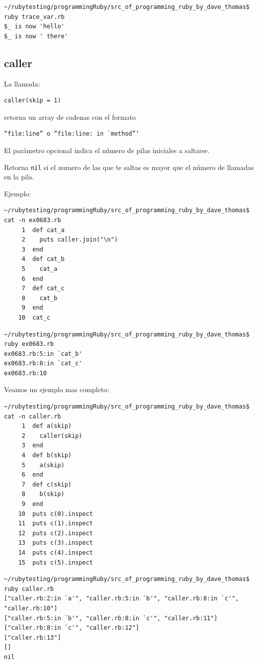 \begin{verbatim}
~/rubytesting/programmingRuby/src_of_programming_ruby_by_dave_thomas$ ruby trace_var.rb 
$_ is now 'hello'
$_ is now ' there'

\end{verbatim}

\subsection{caller}
La llamada:

\begin{verbatim}
caller(skip = 1) 
\end{verbatim}

retorna un array de cadenas con el formato

\begin{verbatim}
“file:line” o “file:line: in `method”‘
\end{verbatim}
El parámetro opcional indica el número de pilas iniciales a saltarse.

Retorna \verb|nil| si el numero de las que te saltas es mayor que el
número de llamadas en la pila.

Ejemplo:
\begin{verbatim}
~/rubytesting/programmingRuby/src_of_programming_ruby_by_dave_thomas$ cat -n ex0683.rb 
     1  def cat_a
     2    puts caller.join("\n")
     3  end
     4  def cat_b
     5    cat_a
     6  end
     7  def cat_c
     8    cat_b
     9  end
    10  cat_c
\end{verbatim}

\begin{verbatim}
~/rubytesting/programmingRuby/src_of_programming_ruby_by_dave_thomas$ ruby ex0683.rb 
ex0683.rb:5:in `cat_b'
ex0683.rb:8:in `cat_c'
ex0683.rb:10
\end{verbatim}

Veamos un ejemplo mas completo:

\begin{verbatim}
~/rubytesting/programmingRuby/src_of_programming_ruby_by_dave_thomas$ cat -n caller.rb 
     1  def a(skip)
     2    caller(skip)
     3  end
     4  def b(skip)
     5    a(skip)
     6  end
     7  def c(skip)
     8    b(skip)
     9  end
    10  puts c(0).inspect   
    11  puts c(1).inspect   
    12  puts c(2).inspect   
    13  puts c(3).inspect   
    14  puts c(4).inspect   
    15  puts c(5).inspect   
\end{verbatim}

\begin{verbatim}
~/rubytesting/programmingRuby/src_of_programming_ruby_by_dave_thomas$ ruby caller.rb 
["caller.rb:2:in `a'", "caller.rb:5:in `b'", "caller.rb:8:in `c'", "caller.rb:10"]
["caller.rb:5:in `b'", "caller.rb:8:in `c'", "caller.rb:11"]
["caller.rb:8:in `c'", "caller.rb:12"]
["caller.rb:13"]
[]
nil
\end{verbatim}

